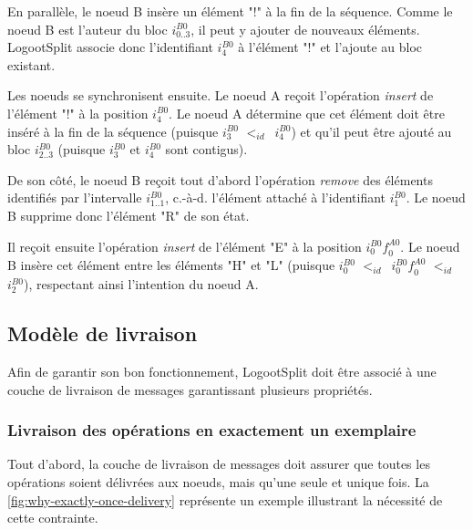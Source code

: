 \documentclass[12pt]{thesul}
\newcommand{\ie}{c.-à-d. }
\newcommand{\trm}[1]{\mathit{#1}}
\newcommand{\id}[3]{$\trm{#1}^{\trm{#2}}_{\trm{#3}}$}
\newcommand{\lid}{$<_{id}$~}
\begin{document}
En parallèle, le noeud B insère un élément "!" à la fin de la séquence.
Comme le noeud B est l'auteur du bloc \id{i}{B0}{0..3}, il peut y ajouter de nouveaux éléments.
LogootSplit associe donc l'identifiant \id{i}{B0}{4} à l'élément "!" et l'ajoute au bloc existant.

Les noeuds se synchronisent ensuite.
Le noeud A reçoit l'opération \emph{insert} de l'élément "!" à la position \id{i}{B0}{4}.
Le noeud A détermine que cet élément doit être inséré à la fin de la séquence (puisque \id{i}{B0}{3} \lid \id{i}{B0}{4}) et qu'il peut être ajouté au bloc \id{i}{B0}{2..3} (puisque \id{i}{B0}{3} et \id{i}{B0}{4} sont contigus).

De son côté, le noeud B reçoit tout d'abord l'opération \emph{remove} des éléments identifiés par l'intervalle \id{i}{B0}{1..1}, \ie l'élément attaché à l'identifiant \id{i}{B0}{1}.
Le noeud B supprime donc l'élément "R" de son état.

Il reçoit ensuite l'opération \emph{insert} de l'élément "E" à la position \id{i}{B0}{0}\id{f}{A0}{0}.
Le noeud B insère cet élément entre les éléments "H" et "L" (puisque \id{i}{B0}{0} \lid \id{i}{B0}{0}\id{f}{A0}{0} \lid \id{i}{B0}{2}), respectant ainsi l'intention du noeud A.


\subsection{Modèle de livraison}

\label{sec:logootsplit-delivery-model}

Afin de garantir son bon fonctionnement, LogootSplit doit être associé à une couche de livraison de messages garantissant plusieurs propriétés.

\subsubsection{Livraison des opérations en exactement un exemplaire}

Tout d'abord, la couche de livraison de messages doit assurer que toutes les opérations soient délivrées aux noeuds, mais qu'une seule et unique fois.
La \autoref{fig:why-exactly-once-delivery} représente un exemple illustrant la nécessité de cette contrainte.
\end{document}
